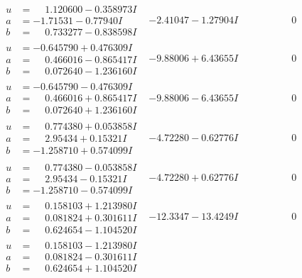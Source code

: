 \documentclass[1p]{elsarticle_modified}
\theoremstyle{definition}
\begin{document}
$$\begin{array}{c|c|c}
\begin{aligned}
u &= \phantom{-}1.120600 - 0.358973 I \\
a &= -1.71531 - 0.77940 I \\
b &= \phantom{-}0.733277 - 0.838598 I\end{aligned}
 & -2.41047 - 1.27904 I & \phantom{-0.000000 } 0 \\ \hline\begin{aligned}
u &= -0.645790 + 0.476309 I \\
a &= \phantom{-}0.466016 - 0.865417 I \\
b &= \phantom{-}0.072640 - 1.236160 I\end{aligned}
 & -9.88006 + 6.43655 I & \phantom{-0.000000 } 0 \\ \hline\begin{aligned}
u &= -0.645790 - 0.476309 I \\
a &= \phantom{-}0.466016 + 0.865417 I \\
b &= \phantom{-}0.072640 + 1.236160 I\end{aligned}
 & -9.88006 - 6.43655 I & \phantom{-0.000000 } 0 \\ \hline\begin{aligned}
u &= \phantom{-}0.774380 + 0.053858 I \\
a &= \phantom{-}2.95434 + 0.15321 I \\
b &= -1.258710 + 0.574099 I\end{aligned}
 & -4.72280 - 0.62776 I & \phantom{-0.000000 } 0 \\ \hline\begin{aligned}
u &= \phantom{-}0.774380 - 0.053858 I \\
a &= \phantom{-}2.95434 - 0.15321 I \\
b &= -1.258710 - 0.574099 I\end{aligned}
 & -4.72280 + 0.62776 I & \phantom{-0.000000 } 0 \\ \hline\begin{aligned}
u &= \phantom{-}0.158103 + 1.213980 I \\
a &= \phantom{-}0.081824 + 0.301611 I \\
b &= \phantom{-}0.624654 - 1.104520 I\end{aligned}
 & -12.3347 - 13.4249 I & \phantom{-0.000000 } 0 \\ \hline\begin{aligned}
u &= \phantom{-}0.158103 - 1.213980 I \\
a &= \phantom{-}0.081824 - 0.301611 I \\
b &= \phantom{-}0.624654 + 1.104520 I\end{aligned}

\end{array}$$
\end{document}
